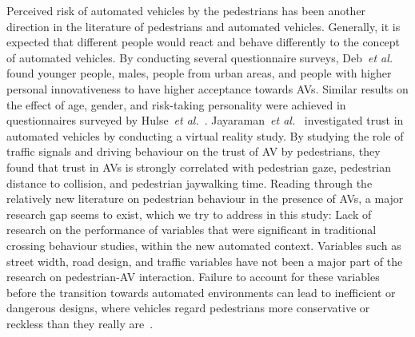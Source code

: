 Perceived risk of automated vehicles by the pedestrians has been another direction in the literature of pedestrians and automated vehicles. Generally, it is expected that different people would react and behave differently to the concept of automated vehicles. By conducting several questionnaire surveys, Deb~\textit{et al.}~\cite{deb2017pedestrians} found younger people, males, people from urban areas, and people with higher personal innovativeness to have higher acceptance towards AVs. Similar results on the effect of age, gender, and risk-taking personality were achieved in questionnaires surveyed by Hulse~\textit{et al.}~\cite{hulse2018perceptions}. Jayaraman~\textit{et al.}~\cite{jayaraman2019pedestrian} investigated trust in automated vehicles by conducting a virtual reality study. By studying the role of traffic signals and driving behaviour on the trust of AV by pedestrians, they found that trust in AVs is strongly correlated with pedestrian gaze, pedestrian distance to collision, and pedestrian jaywalking time. Reading through the relatively new literature on pedestrian behaviour in the presence of AVs, a major research gap seems to exist, which we try to address in this study: Lack of research on the performance of variables that were significant in traditional crossing behaviour studies, within the new automated context. Variables such as street width, road design, and traffic variables have not been a major part of the research on pedestrian-AV interaction.  Failure to account for these variables before the transition towards automated environments can lead to inefficient or dangerous designs, where vehicles regard pedestrians more conservative or reckless than they really are~\citep{rasouli2019autonomous}.

